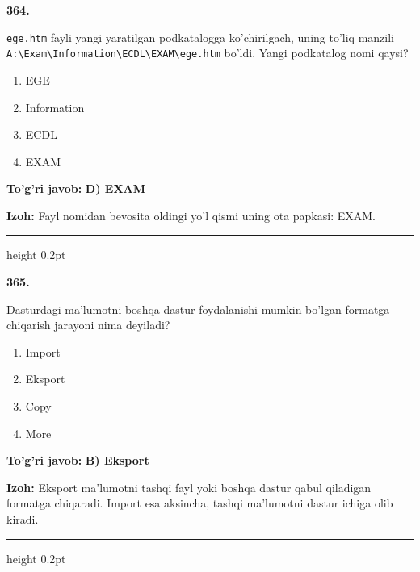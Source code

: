 \documentclass[10pt,a4paper]{article}
\begin{document}
{\bfseries\sffamily\color{ink} 364.}
\par
\texttt{ege.htm} fayli yangi yaratilgan podkatalogga ko'chirilgach, uning to'liq manzili \texttt{A:\textbackslash{}Exam\textbackslash{}Information\textbackslash{}ECDL\textbackslash{}EXAM\textbackslash{}ege.htm} bo'ldi. Yangi podkatalog nomi qaysi?
\begin{enumerate}[label=\Alph*),leftmargin=9mm]
\item EGE
\item Information
\item ECDL
\item EXAM
\end{enumerate}
\begin{tcolorbox}[enhanced,breakable,colback=teal!4,colframe=teal!60!black,boxrule=0.45pt,arc=1.2mm,left=2.7mm,right=2.7mm,top=1.8mm,bottom=1.8mm,before skip=2mm,after skip=2mm]
{\bfseries\sffamily\color{teal}To'g'ri javob:} \textbf{D) EXAM}
\par\smallskip
{\bfseries Izoh:} Fayl nomidan bevosita oldingi yo'l qismi uning ota papkasi: EXAM.
\end{tcolorbox}
\vspace{2mm}\hrule height 0.2pt\vspace{3mm}

{\bfseries\sffamily\color{ink} 365.}
\par
Dasturdagi ma'lumotni boshqa dastur foydalanishi mumkin bo'lgan formatga chiqarish jarayoni nima deyiladi?
\begin{enumerate}[label=\Alph*),leftmargin=9mm]
\item Import
\item Eksport
\item Copy
\item More
\end{enumerate}
\begin{tcolorbox}[enhanced,breakable,colback=teal!4,colframe=teal!60!black,boxrule=0.45pt,arc=1.2mm,left=2.7mm,right=2.7mm,top=1.8mm,bottom=1.8mm,before skip=2mm,after skip=2mm]
{\bfseries\sffamily\color{teal}To'g'ri javob:} \textbf{B) Eksport}
\par\smallskip
{\bfseries Izoh:} Eksport ma'lumotni tashqi fayl yoki boshqa dastur qabul qiladigan formatga chiqaradi. Import esa aksincha, tashqi ma'lumotni dastur ichiga olib kiradi.
\end{tcolorbox}
\vspace{2mm}\hrule height 0.2pt\vspace{3mm}
\end{document}
